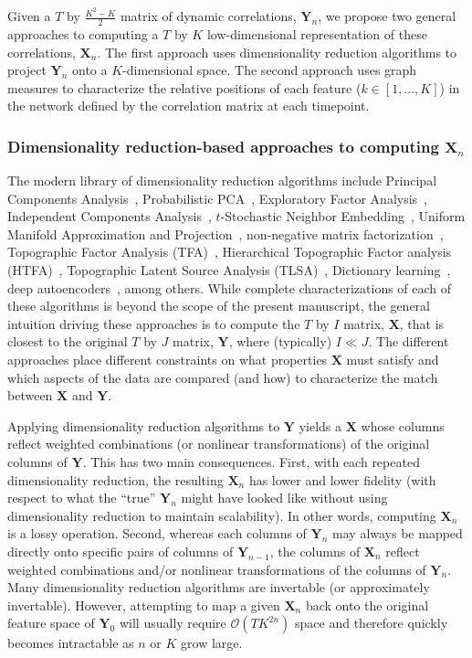 \documentclass[english]{article}
\begin{document}
Given a $T$ by $\frac{K^2 - K}{2}$ matrix of dynamic correlations,
$\mathbf{Y}_n$, we propose two general approaches to computing a $T$
by $K$ low-dimensional representation of these correlations,
$\mathbf{X}_n$.  The first approach uses dimensionality reduction
algorithms to project $\mathbf{Y}_n$ onto a $K$-dimensional space.
The second approach uses graph measures to characterize the
relative positions of each feature ($k \in \left[1, ..., K \right]$)
in the network defined by the correlation matrix at each timepoint.

\subsubsection*{Dimensionality reduction-based approaches to computing
  $\mathbf{X}_n$}

The modern library of dimensionality reduction algorithms include
Principal Components Analysis~\citep[PCA; ][]{Pear01}, Probabilistic
PCA~\citep[PPCA; ][]{TippBish99}, Exploratory Factor
Analysis~\citep[EFA; ][]{Spea04}, Independent Components
Analysis~\citep[ICA; ][]{JuttHera91, ComoEtal91}, $t$-Stochastic
Neighbor Embedding~\citep[$t$-SNE; ][]{MaatHint08}, Uniform Manifold
Approximation and Projection~\citep[UMAP; ][]{McInHeal18},
non-negative matrix factorization~\citep[NMF; ][]{LeeSeun99},
Topographic Factor Analysis (TFA)~\cite{MannEtal14b}, Hierarchical
Topographic Factor analysis (HTFA)~\cite{MannEtal18}, Topographic
Latent Source Analysis (TLSA)~\cite{GersEtal11}, Dictionary
learning~\citep{MairEtal09a, MairEtal09b}, deep
autoencoders~\citep{HintSala06}, among others.  While complete
characterizations of each of these algorithms is beyond the scope of
the present manuscript, the general intuition driving these approaches
is to compute the $T$ by $I$ matrix, $\mathbf{X}$, that is closest
to the original $T$ by $J$ matrix, $\mathbf{Y}$, where (typically)
$I \ll J$.  The different approaches place different constraints on
what properties $\mathbf{X}$ must satisfy and which aspects of
the data are compared (and how) to characterize the match between
$\mathbf{X}$ and $\mathbf{Y}$.

Applying dimensionality reduction algorithms to $\mathbf{Y}$ yields a
$\mathbf{X}$ whose columns reflect weighted combinations (or nonlinear
transformations) of the original columns of $\mathbf{Y}$.  This has
two main consequences.  First, with each repeated dimensionality
reduction, the resulting $\mathbf{X}_n$ has lower and lower fidelity
(with respect to what the ``true'' $\mathbf{Y}_n$ might have looked
like without using dimensionality reduction to maintain scalability).
In other words, computing $\mathbf{X}_n$ is a lossy operation.
Second, whereas each columns of $\mathbf{Y}_n$ may always be mapped
directly onto specific pairs of columns of $\mathbf{Y}_{n-1}$, the
columns of $\mathbf{X}_n$ reflect weighted combinations and/or
nonlinear transformations of the columns of $\mathbf{Y}_n$.  Many
dimensionality reduction algorithms are invertable (or approximately
invertable).  However, attempting to map a given $\mathbf{X}_n$ back
onto the original feature space of $\mathbf{Y}_0$ will usually require
$\mathcal{O}(TK^{2n})$ space and therefore quickly becomes intractable
as $n$ or $K$ grow large.
\end{document}
